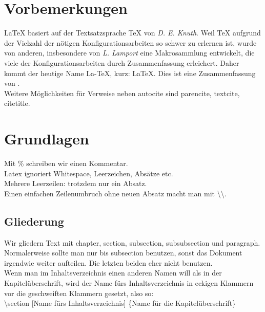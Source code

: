 




\chapter{Vorbemerkungen}

\LaTeX{} basiert auf der Textsatzsprache TeX von \emph{D. E. Knuth}. Weil TeX
aufgrund der Vielzahl der nötigen Konfigurationsarbeiten
so schwer zu erlernen ist, wurde von anderen, insbesondere von \emph{L. Lamport} 
eine Makrosammlung entwickelt, die viele der Konfigurationsarbeiten durch
Zusammenfassung erleichert. Daher kommt der heutige Name La-TeX, kurz: \LaTeX{}.
Dies ist eine Zusammenfassung von \autocite[1012]{Handbuch}. \\

Weitere Möglichkeiten für Verweise neben autocite sind parencite, textcite, citetitle.

\chapter{Grundlagen}

Mit \% schreiben wir einen Kommentar. \\
Latex ignoriert Whitespace, Leerzeichen, Absätze etc.\\
Mehrere Leerzeilen: trotzdem nur ein Absatz.\\
Einen einfachen Zeilenumbruch ohne neuen Absatz macht man 
mit \textbackslash\textbackslash .\\

\section{Gliederung}

Wir gliedern Text mit chapter, section, subsection, subsubsection und paragraph.
Normalerweise sollte man nur bis subsection benutzen, sonst das Dokument irgendwie 
weiter aufteilen. Die letzten beiden eher nicht benutzen. \\ Wenn man im Inhaltsverzeichnis
einen anderen Namen will als in der Kapitelüberschrift, wird der Name fürs
Inhaltsverzeichnis in eckigen Klammern vor die geschweiften Klammern gesetzt, also so: \\
\textbackslash section [Name fürs Inhaltsverzeichnis] \{Name für die Kapitelüberschrift\}

